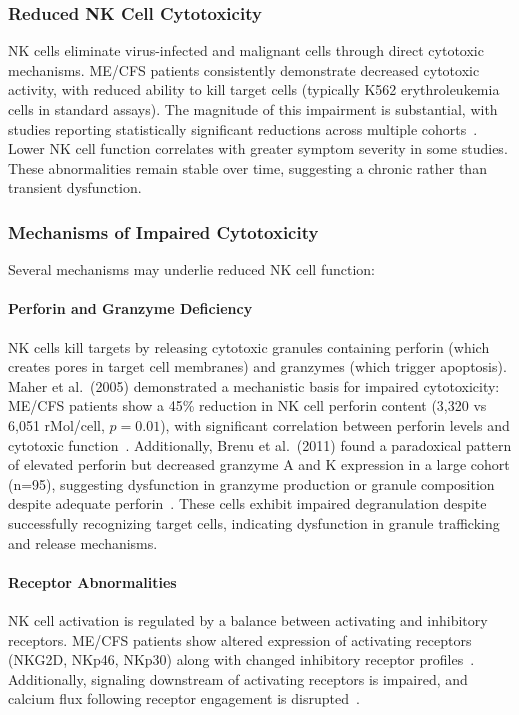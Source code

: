 \subsubsection{Reduced NK Cell Cytotoxicity}

NK cells eliminate virus-infected and malignant cells through direct cytotoxic mechanisms. ME/CFS patients consistently demonstrate decreased cytotoxic activity, with reduced ability to kill target cells (typically K562 erythroleukemia cells in standard assays). The magnitude of this impairment is substantial, with studies reporting statistically significant reductions across multiple cohorts~\cite{EatonFitch2019}. Lower NK cell function correlates with greater symptom severity in some studies. These abnormalities remain stable over time, suggesting a chronic rather than transient dysfunction.

\subsubsection{Mechanisms of Impaired Cytotoxicity}

Several mechanisms may underlie reduced NK cell function:

\paragraph{Perforin and Granzyme Deficiency}
NK cells kill targets by releasing cytotoxic granules containing perforin (which creates pores in target cell membranes) and granzymes (which trigger apoptosis). Maher et al.\ (2005) demonstrated a mechanistic basis for impaired cytotoxicity: ME/CFS patients show a 45\% reduction in NK cell perforin content (3,320 vs 6,051 rMol/cell, $p = 0.01$), with significant correlation between perforin levels and cytotoxic function~\cite{Maher2005}. Additionally, Brenu et al.\ (2011) found a paradoxical pattern of elevated perforin but decreased granzyme A and K expression in a large cohort (n=95), suggesting dysfunction in granzyme production or granule composition despite adequate perforin~\cite{Brenu2011}. These cells exhibit impaired degranulation despite successfully recognizing target cells, indicating dysfunction in granule trafficking and release mechanisms.

\paragraph{Receptor Abnormalities}
NK cell activation is regulated by a balance between activating and inhibitory receptors. ME/CFS patients show altered expression of activating receptors (NKG2D, NKp46, NKp30) along with changed inhibitory receptor profiles~\cite{Brenu2011,EatonFitch2019}. Additionally, signaling downstream of activating receptors is impaired, and calcium flux following receptor engagement is disrupted~\cite{Sasso2026trpm3}.

